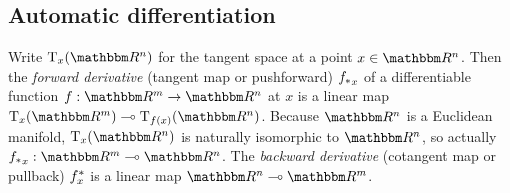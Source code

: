 \subsection{Automatic differentiation}

Write $\tangents_x(\RR^n)$ for the tangent space at a point $x \in \RR^n$. Then the \emph{forward derivative}
(tangent map or pushforward) ${f_{*}}_x$ of a differentiable function $f: \RR^m \to \RR^n$ at $x$ is a
linear map $\tangents_x(\RR^m) \linearto \tangents_{f(x)}(\RR^n)$. Because $\RR^n$ is a Euclidean manifold,
$\tangents_x(\RR^n)$ is naturally isomorphic to $\RR^n$, so actually ${\pushf{f}}_x: \RR^m \linearto \RR^n$.
The \emph{backward derivative} (cotangent map or pullback) $f^{*}_x$  is a linear map $\RR^n \linearto
\RR^m$.
